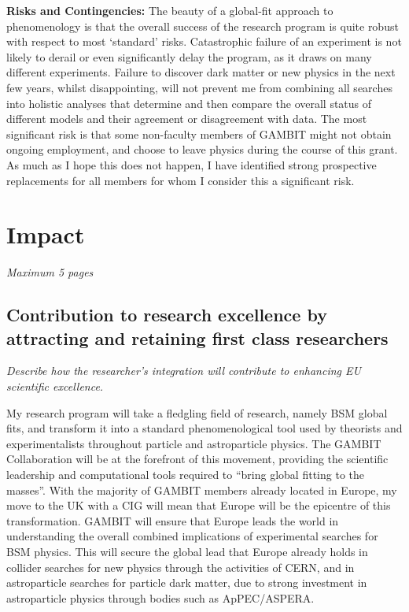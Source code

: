 \documentclass[a4paper,11pt]{article}
\newenvironment{xcomment}{\em}{}
\begin{document}
\textbf{Risks and Contingencies:} The beauty of a global-fit approach to phenomenology is that the overall success of the research program is quite robust with respect to most `standard' risks.  Catastrophic failure of an experiment is not likely to derail or even significantly delay the program, as it draws on many different experiments.  Failure to discover dark matter or new physics in the next few years, whilst disappointing, will not prevent me from combining all searches into holistic analyses that determine and then compare the overall status of different models and their agreement or disagreement with data.  The most significant risk is that some non-faculty members of GAMBIT might not obtain ongoing employment, and choose to leave physics during the course of this grant.  As much as I hope this does not happen, I have identified strong prospective replacements for all members for whom I consider this a significant risk.


\newpage
\section{Impact}
\begin{xcomment}  
Maximum 5 pages
\end{xcomment}

\subsection{Contribution to research excellence by attracting and retaining first class researchers}
\begin{xcomment}
Describe how the researcher's integration will contribute to enhancing
EU scientific excellence.
\end{xcomment}

My research program will take a fledgling field of research, namely BSM global fits, and transform it into a standard phenomenological tool used by theorists and experimentalists throughout particle and astroparticle physics.  The GAMBIT Collaboration will be at the forefront of this movement, providing the scientific leadership and computational tools required to ``bring global fitting to the masses''.  With the majority of GAMBIT members already located in Europe, my move to the UK with a CIG will mean that Europe will be the epicentre of this transformation.  GAMBIT will ensure that Europe leads the world in understanding the overall combined implications of experimental searches for BSM physics.  This will secure the global lead that Europe already holds in collider searches for new physics through the activities of CERN, and in astroparticle searches for particle dark matter, due to strong investment in astroparticle physics through bodies such as ApPEC/ASPERA.
\end{document}
